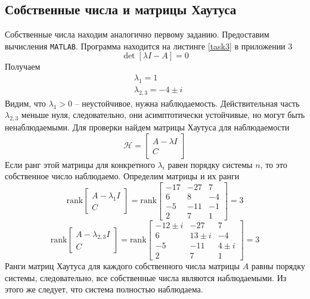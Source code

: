 \documentclass[a4paper, 12pt]{article}
\begin{document}
    \subsection{Собственные числа и матрицы Хаутуса}
    Собственные числа находим аналогично первому заданию. Предоставим вычисления \texttt{MATLAB}. Программа
    находится на листинге \ref{task3} в приложении 3
    $$
    \det{\left[\lambda I-A\right]}=0
    $$
    Получаем
    \begin{align*}
    &\lambda_1=1\\
    &\lambda_{2,3}=-4\pm i
    \end{align*}
    Видим, что $\lambda_1>0$ -- неустойчивое, нужна наблюдаемость. Действительная часть
    $\lambda_{2,3}$ меньше нуля, следовательно, они асимптотически устойчивые, но могут быть ненаблюдаемыми.
    Для проверки найдем матрицы Хаутуса для наблюдаемости
    $$
    \mathcal{H}=\begin{bmatrix}
        A-\lambda I\\
        C
    \end{bmatrix}
    $$
    Если ранг этой матрицы для конкретного $\lambda_i$ равен порядку системы $n$, то это собственное число наблюдаемо.
    Определим матрицы и их ранги
    $$
    \text{rank}\begin{bmatrix}
        A-\lambda_1 I\\
        C
    \end{bmatrix}=\text{rank}\begin{bmatrix}
    -17  &-27    &7\\
    6    &8   &-4\\
   -5  &-11   &-1\\
    2    &7    &1
    \end{bmatrix}=3
    $$
    $$
    \text{rank}\begin{bmatrix}
        A-\lambda_{2,3} I\\
        C
    \end{bmatrix}=\text{rank}\begin{bmatrix}
    -12\pm i &-27   &7\\
    6  &13\pm i  &-4\\
    -5 &-11   &4\pm i\\
    2   &7   &1
    \end{bmatrix}=3
    $$
    Ранги матриц Хаутуса для каждого собственного числа матрицы $A$ равны порядку
    системы, следовательно, все собственные числа являются наблюдаемыми. Из этого
    же следует, что система полностью наблюдаема.
\end{document}
